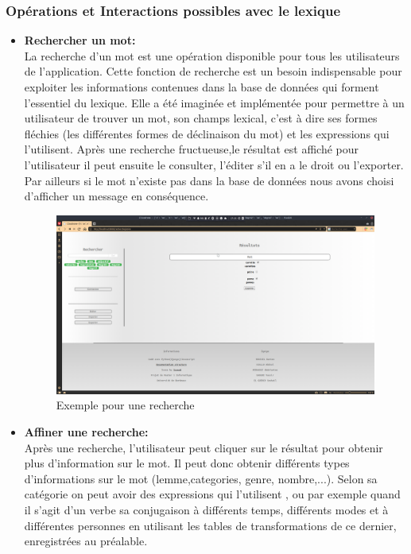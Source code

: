 \documentclass[a4paper, 12pt]{article}
\begin{document}
\subsubsection{Opérations et Interactions possibles avec le lexique}
\begin{itemize}
    \item \textbf{Rechercher un mot:}\\
    La recherche d'un mot est une opération disponible pour tous les utilisateurs de l'application. Cette fonction de recherche est un besoin indispensable pour exploiter les informations contenues dans la base de données qui forment l'essentiel du lexique. Elle a été imaginée et implémentée pour permettre à un utilisateur de trouver un mot, son champs lexical, c'est à dire ses formes fléchies (les différentes formes de déclinaison du mot) et les expressions qui l'utilisent. Après une recherche fructueuse,le résultat est affiché pour l'utilisateur il peut ensuite le consulter, l'éditer s'il en a le droit ou l'exporter. Par ailleurs si le mot n'existe pas dans la base de données nous avons choisi d'afficher un message en conséquence.  
    \begin{figure}[H] 
    \centering
    \includegraphics[scale=0.27]{recherche.png}
    \caption{Exemple pour une recherche }
    \end{figure}
    \item \textbf{Affiner une recherche:}\\
    Après une recherche, l'utilisateur peut cliquer sur le résultat pour obtenir plus d'information sur le mot. Il peut donc obtenir différents types d'informations sur le mot (lemme,categories, genre, nombre,...). Selon sa catégorie on peut avoir des expressions qui l'utilisent , ou par exemple quand il s'agit d'un verbe sa conjugaison à différents temps, différents modes et à différentes personnes en utilisant les tables de transformations de ce dernier, enregistrées au préalable.

\end{itemize}
\end{document}
